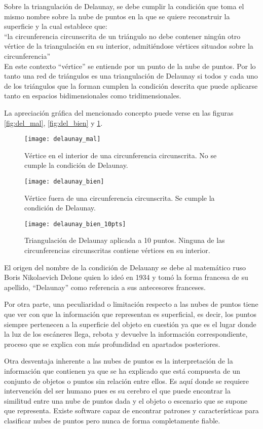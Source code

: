 Sobre la triangulación de Delaunay, se debe cumplir la condición que toma el mismo nombre sobre la nube de puntos en la que se quiere reconstruir la superficie y la cual establece que:
\\
``la circunferencia circunscrita de un triángulo no debe contener ningún otro vértice de la triangulación en su interior, admitiéndose vértices situados sobre la circunferencia''
\\
En este contexto ``vértice'' se entiende por un punto de la nube de puntos.
Por lo tanto una red de triángulos es una triangulación de Delaunay si todos y cada uno de los triángulos que la forman cumplen la condición descrita que puede aplicarse tanto en espacios bidimensionales como tridimensionales.

La apreciación gráfica del mencionado concepto puede verse en las figuras \ref{fig:del_mal}, \ref{fig:del_bien} y \ref{fig:del_bien_10pts}.

\begin{figure}[!htb]
  \texttt{[image: delaunay\_mal]} 
\caption{Vértice en el interior de una circunferencia circunscrita. No se cumple la condición de Delaunay.}
\label{fig:del_mal}
\endminipage\hfill
{}
 \texttt{[image: delaunay\_bien]}
\caption{Vértice fuera de una circunferencia circunscrita. Se cumple la condición de Delaunay.}
\label{fig:del_bien}
\endminipage\hfill
{}
  \texttt{[image: delaunay\_bien\_10pts]}
\caption{Triangulación de Delaunay aplicada a 10 puntos. Ninguna de las circunferencias circunscritas contiene vértices en su interior.}
\label{fig:del_bien_10pts}
\endminipage\hfill
\end{figure}


El origen del nombre de la condición de Delauany se debe al matemático ruso Boris Nikolaevich Delone quien lo ideó en 1934 y tomó la forma francesa de su apellido, ``Delaunay'' como referencia a sus antecesores franceses.


Por otra parte, una peculiaridad o limitación respecto a las nubes de puntos tiene que ver con que la
información que representan es superficial, es decir, los puntos siempre pertenecen a la superficie del
objeto en cuestión ya que es el lugar donde la luz de los escáneres llega, rebota y devuelve la
información correspondiente, proceso que se explica con más profundidad en apartados posteriores.

Otra desventaja inherente a las nubes de puntos es la interpretación de la información que contienen ya
que se ha explicado que está compuesta de un conjunto de objetos o puntos sin relación entre ellos. Es
aquí donde se requiere intervención del ser humano pues es su cerebro el que puede encontrar la similitud
entre una nube de puntos dada y el objeto o escenario que se supone que representa. Existe software capaz
de encontrar patrones y características para clasificar nubes de puntos pero nunca de forma
completamente fiable.

